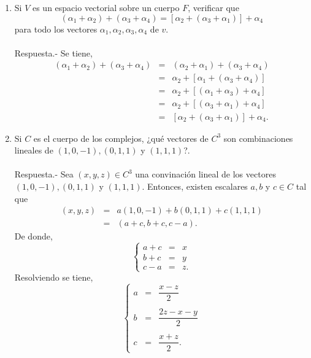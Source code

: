 \begin{enumerate}[\bfseries 1.]
\begin{enumerate}[(1)]
	\end{enumerate}

    \item Si $V$ es un espacio vectorial sobre un cuerpo $F$, verificar que
    $$(\alpha_1+\alpha_2)+(\alpha_3+\alpha_4)=\left[\alpha_2+(\alpha_3+\alpha_1)\right]+\alpha_4$$
    para todo los vectores $\alpha_1,\alpha_2,\alpha_3,\alpha_4$ de $v$.\\\\
	Respuesta.-\; Se tiene,
	$$
	\begin{array}{rcl}
	    (\alpha_1+\alpha_2)+(\alpha_3+\alpha_4) &=& (\alpha_2+\alpha_1)+(\alpha_3+\alpha_4)\\
						    &=& \alpha_2+\left[\alpha_1+(\alpha_3+\alpha_4)\right]\\
						    &=& \alpha_2+\left[(\alpha_1+\alpha_3)+\alpha_4\right]\\
						    &=& \alpha_2+\left[(\alpha_3+\alpha_1)+\alpha_4\right]\\
						    &=& \left[\alpha_2+(\alpha_3+\alpha_1)\right]+\alpha_4.
	\end{array}
	$$
	\vspace{.5cm}

    \item Si $C$ es el cuerpo de los complejos, ¿qué vectores de $C^3$ son combinaciones lineales de $(1,0,-1),(0,1,1)$ y $(1,1,1)$?.\\\\
	Respuesta.-\; Sea $(x,y,z)\in C^3$ una convinación lineal de los vectores $(1,0,-1),(0,1,1)$ y $(1,1,1)$. Entonces, existen escalares $a,b$ y $c\in C$ tal que
	$$
	\begin{array}{rcl}
	    (x,y,z)&=&a(1,0,-1)+b(0,1,1)+c(1,1,1)\\
		   &=& (a+c,b+c,c-a).
	\end{array}
	$$
	De donde, 
	$$
	\left\{	
	    \begin{array}{rcl}
		a+c & = & x\\
		b+c & = & y\\
		c-a & = & z.
	    \end{array}
	\right.
	$$
	Resolviendo se tiene,
	$$
	\left\{	
	    \begin{array}{rcl}
		a & = & \dfrac{x-z}{2}\\\\
		b & = & \dfrac{2z-x-y}{2}\\\\
		c & = & \dfrac{x+z}{2}.
	    \end{array}
	\right.
	$$


\end{enumerate}
